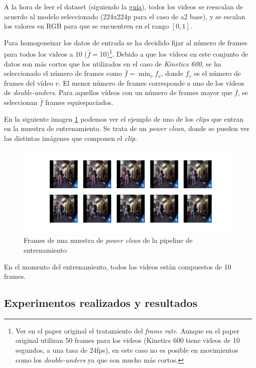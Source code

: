 A la hora de leer el dataset (siguiendo la \href{https://plaguss.github.io/movinets_helper/how-to-guides/#how-to-ingest-a-dataset}{guía}), todos los videos se reescalan de acuerdo al modelo seleccionado (224x224p para el caso de a2 base), y se escalan los valores en RGB para que se encuentren en el rango $[0, 1]$.

Para homogeneizar los datos de entrada se ha decidido fijar al número de frames para todos los videos a 10 ($\bar{f}=10$)\footnote{Ver en el paper original el tratamiento del \textit{frame rate}. Aunque en el paper original utilizan 50 frames para los videos (Kinetics 600 tiene videos de 10 segundos, a una tasa de 24fps), en este caso no es posible en movimientos como los \textit{double-unders} ya que son mucho más cortos.}. Debido a que los vídeos en este conjunto de datos son más cortos que los utilizados en el caso de \textit{Kinetics 600}, se ha seleccionado el número de frames como $\bar{f} = \min_v f_{v}$, donde $f_v$ es el número de frames del vídeo $v$. El menor número de frames corresponde a uno de los vídeos de \textit{double-unders}. Para aquellos vídeos con un número de frames mayor que $\bar{f}$, se seleccionan $\bar{f}$ frames equiespaciados.

En la siguiente imagen \ref{frames} podemos ver el ejemplo de uno de los \textit{clips} que entran en la muestra de entrenamiento. Se trata de un \textit{power clean}, donde se pueden ver las distintas imágenes que componen el \textit{clip}.

\begin{figure}[H]
    \centerline{\includegraphics[width=1.25\linewidth]{figs/frames.png}}
\caption{Frames de una muestra de \textit{power clean} de la pipeline de entrenamiento}\label{frames}
\end{figure}

En el momento del entrenamiento, todos los videos están compuestos de 10 frames.

\subsection{Experimentos realizados y resultados}

